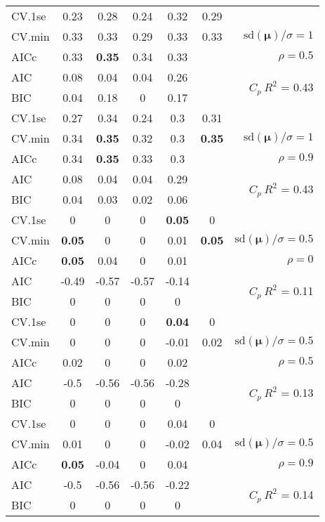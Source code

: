 \documentclass[12pt]{article}
\newcommand{\mr}[1]{\mathrm{#1}}
\newcommand{\bm}[1]{\mathbf{#1}}
\begin{document}
\begin{table}[p]
\begin{center}
\begin{tabular}{l*{5}{c}|r}
CV.1se & 0.23 & 0.28 & 0.24 & 0.32 & 0.29 &\\
CV.min & 0.33 & 0.33 & 0.29 & 0.33 & 0.33 &  $\mr{sd}(\bm{\mu})/\sigma=1$ \\
AICc & 0.33 & {\bf 0.35} & 0.34 & 0.33 & & $\rho=0.5$ \\
AIC & 0.08 & 0.04 & 0.04 & 0.26 & & \multirow{2}{*}{$C_p ~ R^2$ = 0.43} \\
BIC & 0.04 & 0.18 & 0 & 0.17 & & \\
 \hline 
CV.1se & 0.27 & 0.34 & 0.24 & 0.3 & 0.31 &\\
CV.min & 0.34 & {\bf 0.35} & 0.32 & 0.3 & {\bf 0.35} &  $\mr{sd}(\bm{\mu})/\sigma=1$ \\
AICc & 0.34 & {\bf 0.35} & 0.33 & 0.3 & & $\rho=0.9$ \\
AIC & 0.08 & 0.04 & 0.04 & 0.29 & & \multirow{2}{*}{$C_p ~ R^2$ = 0.43} \\
BIC & 0.04 & 0.03 & 0.02 & 0.06 & & \\
 \hline 
CV.1se & 0 & 0 & 0 & {\bf 0.05} & 0 &\\
CV.min & {\bf 0.05} & 0 & 0 & 0.01 & {\bf 0.05} &  $\mr{sd}(\bm{\mu})/\sigma=0.5$ \\
AICc & {\bf 0.05} & 0.04 & 0 & 0.01 & & $\rho=0$ \\
AIC & -0.49 & -0.57 & -0.57 & -0.14 & & \multirow{2}{*}{$C_p ~ R^2$ = 0.11} \\
BIC & 0 & 0 & 0 & 0 & & \\
 \hline 
CV.1se & 0 & 0 & 0 & {\bf 0.04} & 0 &\\
CV.min & 0 & 0 & 0 & -0.01 & 0.02 &  $\mr{sd}(\bm{\mu})/\sigma=0.5$ \\
AICc & 0.02 & 0 & 0 & 0.02 & & $\rho=0.5$ \\
AIC & -0.5 & -0.56 & -0.56 & -0.28 & & \multirow{2}{*}{$C_p ~ R^2$ = 0.13} \\
BIC & 0 & 0 & 0 & 0 & & \\
 \hline 
CV.1se & 0 & 0 & 0 & 0.04 & 0 &\\
CV.min & 0.01 & 0 & 0 & -0.02 & 0.04 &  $\mr{sd}(\bm{\mu})/\sigma=0.5$ \\
AICc & {\bf 0.05} & -0.04 & 0 & 0.04 & & $\rho=0.9$ \\
AIC & -0.5 & -0.56 & -0.56 & -0.22 & & \multirow{2}{*}{$C_p ~ R^2$ = 0.14} \\
BIC & 0 & 0 & 0 & 0 & & \\
 \hline 
\end{tabular}
\end{center}
\vspace{-1cm}
\end{table}
\end{document}
